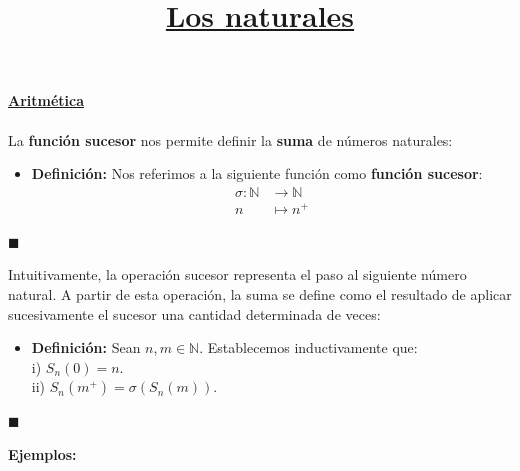 \documentclass[10 pt]{article}
\title{\textbf{\underline{Los naturales}}}
\author{}
\date{}
\begin{document}
\pagestyle{empty}
\maketitle
\thispagestyle{empty}

\section*{}

\LARGE{\textbf{\underline{Aritmética}}}\\ \\

\Large{La \textbf{función sucesor} nos permite definir la \textbf{suma} de números naturales:} \\

\begin{itemize}
    \item \Large{\textbf{Definición:} Nos referimos a la siguiente función como \textbf{función sucesor}:}
    \begin{align*}
        \sigma:\mathbb N &\rightarrow \mathbb N \\
        n &\mapsto n^+
    \end{align*}
\end{itemize}

\begin{flushright}
   $\blacksquare$
\end{flushright}

\Large{Intuitivamente, la operación sucesor representa el paso al siguiente número natural. A partir de esta operación, la suma se define como el resultado de aplicar sucesivamente el sucesor una cantidad determinada de veces:} \\

\begin{itemize}
    \item \Large{\textbf{Definición:} Sean $n,m \in \mathbb N$. Establecemos inductivamente que: \\

    i) $S_n(0)=n$. \\

    ii) $S_n(m^+)=\sigma(S_n(m))$.} \\
\end{itemize}

\begin{flushright}
    $\blacksquare$
\end{flushright}

\Large{\textbf{Ejemplos:}} \\
\end{document}
